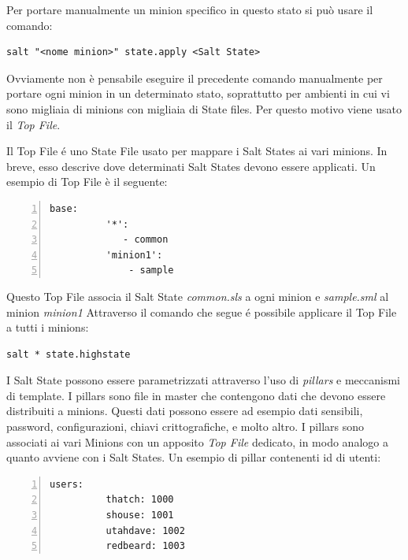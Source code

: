 Per portare manualmente un minion specifico in questo stato si può usare il comando:
\begin{center}
    \begin{BVerbatim}
salt "<nome minion>" state.apply <Salt State> 
    \end{BVerbatim}
\end{center}

Ovviamente non è pensabile eseguire il precedente comando manualmente per portare ogni minion in un determinato stato, soprattutto per ambienti in cui vi sono migliaia di minions con migliaia di State files. Per questo motivo viene usato il \textit{Top File}.

Il Top File é uno State File usato per  mappare i Salt States ai vari minions. In breve, esso descrive dove determinati Salt States devono essere applicati.
Un esempio di Top File è il seguente:
    \begin{Verbatim}[numbers=left,frame=single,fontsize=\small]
        base:
          '*':
             - common
          'minion1':
              - sample
    \end{Verbatim} 
Questo Top File associa il Salt State \textit{common.sls} a ogni minion e \textit{sample.sml} al minion \textit{minion1}
Attraverso il comando che segue é possibile applicare il Top File a tutti i minions:
\begin{center}
    \begin{BVerbatim}
salt * state.highstate
    \end{BVerbatim}
\end{center}

I Salt State possono essere parametrizzati attraverso l'uso di  \textit{pillars} e meccanismi di template.
I pillars sono file in master che contengono dati che devono essere distribuiti a minions. Questi dati possono essere ad esempio dati sensibili, password, configurazioni, chiavi crittografiche, e molto altro.
I pillars sono associati ai vari Minions con un apposito \textit{Top File} dedicato, in modo analogo a quanto avviene con i Salt States.
Un esempio di pillar contenenti id di utenti:
    \begin{Verbatim}[numbers=left,frame=single,fontsize=\small]
        users:
          thatch: 1000
          shouse: 1001
          utahdave: 1002
          redbeard: 1003
    \end{Verbatim}


